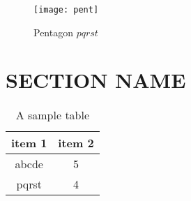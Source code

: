 \begin{figure}[here]
\begin{center}	
\texttt{[image: pent]} 
\caption{Pentagon $pqrst$}
\label{fig:pent}
\end{center}
\end{figure}

\lipsum[1]

\section{SECTION NAME}
\lipsum[2]

\begin{table}
\centering
\begin{tabular}{| c | c |}
\hline
{\bf item 1} & {\bf item 2} \\ \hline
%
abcde & 5 \\ \hline
%
pqrst & 4 \\ \hline
\end{tabular}
\caption{A sample table}
\label{table:1}
\end{table}

